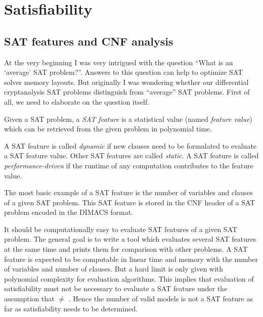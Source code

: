 \renewcommand*\chappic{img/satisfiability.pdf}
\renewcommand*\chapquote{What idiot called them logic errors rather than bool shit?}
\chapter{Satisfiability}
\label{ch:sat}
\vspace{50pt}

\section{SAT features and CNF analysis}
\label{sec:sat-features}
%
At the very beginning I was very intrigued with the question
\enquote{What is an \enquote{average} SAT problem?}. Answers to this
question can help to optimize SAT solver memory layouts.
But originally I was wondering whether our differential cryptanalysis
SAT problems distinguish from \enquote{average} SAT problems.
First of all, we need to elaborate on the question itself.

\begin{defi}
  Given a SAT problem, a \emph{SAT feature} is a statistical value
  (named \emph{feature value}) which can be retrieved from the given
  problem in polynomial time.

  A SAT feature is called \emph{dynamic} if new clauses need to be formulated
  to evaluate a SAT feature value. Other SAT features are called \emph{static}.
  A SAT feature is called \emph{performance-driven} if the runtime of any
  computation contributes to the feature value.
\end{defi}

The most basic example of a SAT feature is the number of variables and clauses
of a given SAT problem. This SAT feature is stored in the CNF header of a SAT
problem encoded in the DIMACS format.

It should be computationally easy to evaluate SAT features of a given SAT problem.
The general goal is to write a tool which evaluates several SAT features at the same
time and prints them for comparison with other problems. A SAT feature
is expected to be computable in linear time and memory with the number of variables
and number of clauses. But a hard limit is only given with polynomial complexity
for evaluation algorithms. This implies that evaluation of satisfiability
must not be necessary to evaluate a SAT feature under the assumption that \cP $\neq$ \cNP.
Hence the number of valid models is not a SAT feature as far as satisfiability
needs to be determined.

